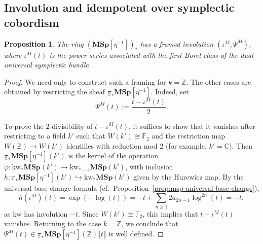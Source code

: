 \documentclass[a4paper]{amsart}
\theoremstyle{plain}
\newtheorem{proposition}[subsubsection]{Proposition}
\theoremstyle{definition}
\newcommand{\MSp}{\mathbf{MSp}}
\newcommand{\etainv}{\eta^{-1}}
\newcommand{\MSpetainv}{{\MSp[\etainv]}}
\newcommand{\kw}{\mathrm{kw}}
\newcommand{\ZZ}{\mathbb{Z}}
\newcommand{\FF}{\mathbb{F}}
\renewcommand{\ge}{\geqslant}
\begin{document}
\subsection{Involution and idempotent over symplectic cobordism}
\begin{proposition}\label{prop:msp-framed-involution}
	The ring $(\MSpetainv)_*$ has a framed involution $(\iota^M, \Psi^M)$, where $\iota^{M}(t)$ is the power series associated with the first Borel class of the dual universal symplectic bundle.
\end{proposition}
\begin{proof}
	We need only to construct such a framing for $k=\ZZ$. The other cases are obtained by restricting the sheaf $\underline{\pi}_* \MSpetainv$. Indeed, set
	\[
		\Psi^{M}(t) := \frac{t - \iota^{M}(t)}{2}.
	\]

	To prove the $2$-divisibility of $t-\iota^M(t)$, it suffices to show that it vanishes after restricting to a field $k'$ such that $W(k') \cong \FF_2$ and the restriction map $W(\ZZ) \to W(k')$ identifies with reduction mod $2$ (for example, $k'=\mathbb{C}$). Then $\underline{\pi}_* \MSpetainv(k')$ is the kernel of the operation $\varphi: \kw_*\MSp(k') \to \kw_{*-4}\MSp(k')$, with inclusion $h:\underline{\pi}_* \MSpetainv(k') \hookrightarrow \kw_*\MSp(k')$ given by the Hurewicz map. By the universal base-change formula (cf.~Proposition~\ref{prop:msp-universal-base-change}),
	\[
		h(\iota^M)(t) = \exp( - \log(t)) =  - t + \sum_{n\ge 1} 2 a_{2n-1} \log^{2n}\left(t\right) = -t,
	\]
	as $\kw$ has involution $-t$. Since $W(k') \cong \FF_2$, this implies that $t-\iota^M(t)$ vanishes. Returning to the case $k=\ZZ$, we conclude that $\Psi^M(t) \in \underline{\pi}_* \MSpetainv(\ZZ)\llbracket t \rrbracket$ is well defined.
\end{proof}
\end{document}
